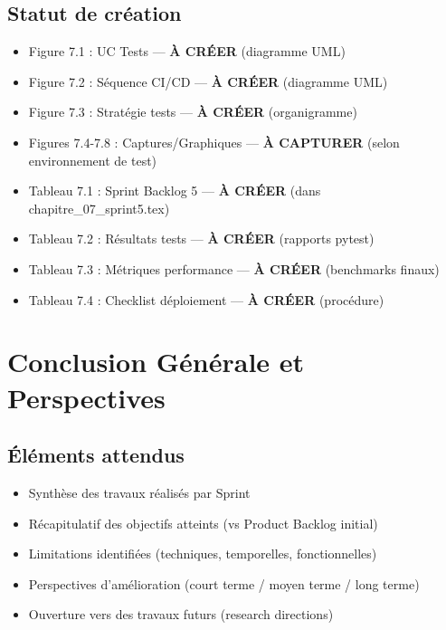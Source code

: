 \documentclass[12pt,a4paper]{article}
\begin{document}
\subsection*{Statut de création}

\begin{itemize}
    \item[\textcolor{green}{\checkmark}] Figure 7.1 : UC Tests — \textbf{À CRÉER} (diagramme UML)
    \item[\textcolor{green}{\checkmark}] Figure 7.2 : Séquence CI/CD — \textbf{À CRÉER} (diagramme UML)
    \item[\textcolor{green}{\checkmark}] Figure 7.3 : Stratégie tests — \textbf{À CRÉER} (organigramme)
    \item[\textcolor{orange}{!}] Figures 7.4-7.8 : Captures/Graphiques — \textbf{À CAPTURER} (selon environnement de test)
    
    \item[\textcolor{green}{\checkmark}] Tableau 7.1 : Sprint Backlog 5 — \textbf{À CRÉER} (dans chapitre\_07\_sprint5.tex)
    \item[\textcolor{green}{\checkmark}] Tableau 7.2 : Résultats tests — \textbf{À CRÉER} (rapports pytest)
    \item[\textcolor{green}{\checkmark}] Tableau 7.3 : Métriques performance — \textbf{À CRÉER} (benchmarks finaux)
    \item[\textcolor{green}{\checkmark}] Tableau 7.4 : Checklist déploiement — \textbf{À CRÉER} (procédure)
\end{itemize}


\section{Conclusion Générale et Perspectives}

\subsection*{Éléments attendus}

\begin{itemize}
    \item Synthèse des travaux réalisés par Sprint
    \item Récapitulatif des objectifs atteints (vs Product Backlog initial)
    \item Limitations identifiées (techniques, temporelles, fonctionnelles)
    \item Perspectives d'amélioration (court terme / moyen terme / long terme)
    \item Ouverture vers des travaux futurs (research directions)
\end{itemize}
\end{document}
